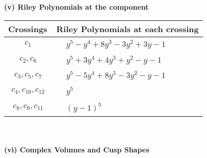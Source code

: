 \documentclass[1p]{elsarticle_modified}
\theoremstyle{definition}
\begin{document}
\newpage\renewcommand{\arraystretch}{1}
\flushleft \textbf{(v) Riley Polynomials at the component}\newline \\
\begin{tabular}{m{50pt}|m{274pt}}
Crossings & \hspace{64pt}Riley Polynomials at each crossing \\
\hline $$\begin{aligned}c_{1}\end{aligned}$$&$\begin{aligned}
&y^5- y^4+8 y^3-3 y^2+3 y-1
\end{aligned}$\\
\hline $$\begin{aligned}c_{2},c_{6}\end{aligned}$$&$\begin{aligned}
&y^5+3 y^4+4 y^3+y^2- y-1
\end{aligned}$\\
\hline $$\begin{aligned}c_{3},c_{5},c_{7}\end{aligned}$$&$\begin{aligned}
&y^5-5 y^4+8 y^3-3 y^2- y-1
\end{aligned}$\\
\hline $$\begin{aligned}c_{4},c_{10},c_{12}\end{aligned}$$&$\begin{aligned}
&y^5
\end{aligned}$\\
\hline $$\begin{aligned}c_{8},c_{9},c_{11}\end{aligned}$$&$\begin{aligned}
&(y-1)^5
\end{aligned}$\\
\hline
\end{tabular}\\~\\
\newpage\flushleft \textbf{(vi) Complex Volumes and Cusp Shapes}
\end{document}
